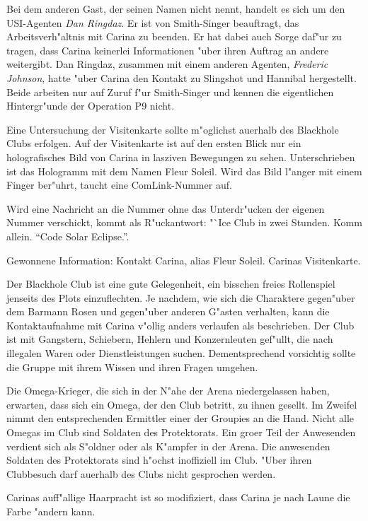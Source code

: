 Bei dem anderen Gast, der seinen Namen nicht nennt, handelt es sich um den USI-Agenten \emph{Dan Ringdaz}. Er ist von Smith-Singer beauftragt, das Arbeitsverh"altnis mit Carina zu beenden. Er hat dabei auch Sorge daf"ur zu tragen, dass Carina keinerlei Informationen "uber ihren Auftrag an andere weitergibt. Dan Ringdaz, zusammen mit einem anderen Agenten, \emph{Frederic Johnson}, hatte "uber Carina den Kontakt zu Slingshot und Hannibal hergestellt. Beide arbeiten nur auf Zuruf f"ur Smith-Singer und kennen die eigentlichen Hintergr"unde der Operation P9 nicht.


Eine Untersuchung der Visitenkarte sollte m"oglichst au\3erhalb des Blackhole Clubs erfolgen. Auf der Visitenkarte ist auf den ersten Blick nur ein holografisches Bild von Carina in lasziven Bewegungen zu sehen. Unterschrieben ist das Hologramm mit dem Namen Fleur Soleil. Wird das Bild l"anger mit einem Finger ber"uhrt, taucht eine ComLink-Nummer auf.

Wird eine Nachricht an die Nummer ohne das Unterdr"ucken der eigenen Nummer verschickt, kommt als R"uckantwort: "`Ice Club in zwei Stunden. Komm allein. "`Code Solar Eclipse."'.

\begin{remarks}
	Gewonnene Information: Kontakt Carina, alias Fleur Soleil. Carinas Visitenkarte.

	Der Blackhole Club ist eine gute Gelegenheit, ein bisschen freies Rollenspiel jenseits des Plots einzuflechten. Je nachdem, wie sich die Charaktere gegen"uber dem Barmann Rosen und gegen"uber anderen G"asten verhalten, kann die Kontaktaufnahme mit Carina v"ollig anders verlaufen als beschrieben. Der Club ist mit Gangstern, Schiebern, Hehlern und Konzernleuten gef"ullt, die nach illegalen Waren oder Dienstleistungen suchen. Dementsprechend vorsichtig sollte die Gruppe mit ihrem Wissen und ihren Fragen umgehen.

	Die Omega-Krieger, die sich in der N"ahe der Arena niedergelassen haben, erwarten, dass sich ein Omega, der den Club betritt, zu ihnen gesellt. Im Zweifel nimmt den entsprechenden Ermittler einer der Groupies an die Hand. Nicht alle Omegas im Club sind Soldaten des Protektorats. Ein gro\3er Teil der Anwesenden verdient sich als S"oldner oder als K"ampfer in der Arena. Die anwesenden Soldaten des Protektorats sind h"ochst inoffiziell im Club. "Uber ihren Clubbesuch darf au\3erhalb des Clubs nicht gesprochen werden.
	
	Carinas auff"allige Haarpracht ist so modifiziert, dass Carina je nach Laune die Farbe "andern kann.
\end{remarks}


